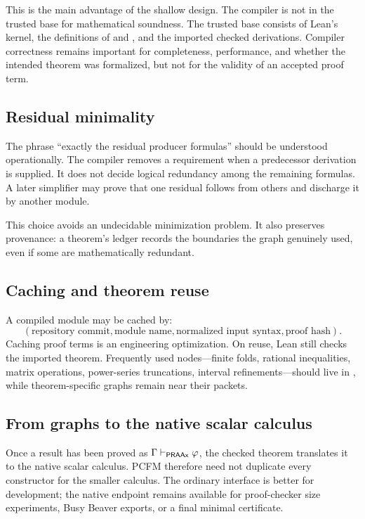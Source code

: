 This is the main advantage of the shallow design.  The compiler is not in the
trusted base for mathematical soundness.  The trusted base consists of Lean's
kernel, the definitions of  and , and the imported
checked derivations.  Compiler correctness remains important for completeness,
performance, and whether the intended theorem was formalized, but not for the
validity of an accepted proof term.

\subsection{Residual minimality}

The phrase ``exactly the residual producer formulas'' should be understood
operationally.  The compiler removes a requirement when a predecessor
derivation is supplied.  It does not decide logical redundancy among the
remaining formulas.  A later simplifier may prove that one residual follows
from others and discharge it by another module.

This choice avoids an undecidable minimization problem.  It also preserves
provenance: a theorem's ledger records the boundaries the graph genuinely
used, even if some are mathematically redundant.

\subsection{Caching and theorem reuse}

A compiled module may be cached by:
\[
  (\text{repository commit},\text{module name},
    \text{normalized input syntax},\text{proof hash}).
\]
Caching proof terms is an engineering optimization.  On reuse, Lean still
checks the imported theorem.  Frequently used nodes---finite folds, rational
inequalities, matrix operations, power-series truncations, interval
refinements---should live in , while theorem-specific
graphs remain near their packets.

\subsection{From graphs to the native scalar calculus}

Once a result has been proved as
\(\Gamma\vdash_{\mathsf{PRAAx}}\varphi\), the checked theorem
 translates it to the native scalar calculus.  PCFM
therefore need not duplicate every constructor for the smaller calculus.
The ordinary interface is better for development; the native endpoint remains
available for proof-checker size experiments, Busy Beaver exports, or a final
minimal certificate.
